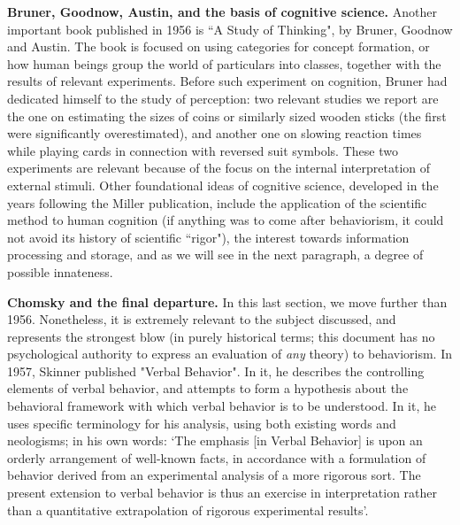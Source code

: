 \documentclass[../main.tex]{subfiles}
\begin{document}
\vspace{4pt}
\textbf{Bruner, Goodnow, Austin, and the basis of cognitive science.}
Another important book published in 1956 is ``A Study of Thinking", by Bruner, Goodnow and Austin. The book is focused on using categories for concept formation, or how human beings group the world of particulars into classes, together with the results of relevant experiments. Before such experiment on cognition, Bruner had dedicated himself to the study of perception: two relevant studies we report are the one on estimating the sizes of coins or similarly sized wooden sticks (the first were significantly overestimated), and another one on slowing reaction times while playing cards in connection with reversed suit symbols. These two experiments are relevant because of the focus on the internal interpretation of external stimuli. Other foundational ideas of cognitive science, developed in the years following the Miller publication, include the application of the scientific method to human cognition (if anything was to come after behaviorism, it could not avoid its history of scientific ``rigor"), the interest towards information processing and storage, and as we will see in the next paragraph, a degree of possible innateness.

\vspace{4pt}
\textbf{Chomsky and the final departure.}
In this last section, we move further than 1956. Nonetheless, it is extremely relevant to the subject discussed, and represents the strongest blow (in purely historical terms; this document has no psychological authority to express an evaluation of \textit{any} theory) to behaviorism. In 1957, Skinner published "Verbal Behavior". In it, he describes the controlling elements of verbal behavior, and attempts to form a hypothesis about the behavioral framework with which verbal behavior is to be understood. In it, he uses specific terminology for his analysis, using both existing words and neologisms; in his own words: \enquote*{The emphasis [in Verbal Behavior] is upon an orderly arrangement of well-known facts, in accordance with a formulation of behavior derived from an experimental analysis of a more rigorous sort. The present extension to verbal behavior is thus an exercise in interpretation rather than a quantitative extrapolation of rigorous experimental results}\cite{skinnerVerbalBehavior1957}.
\end{document}
